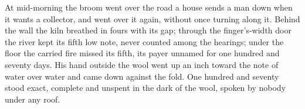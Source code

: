 At mid-morning the broom went over the road a house sends a man down when it wants a collector, and went over it again, without once turning along it. Behind the wall the kiln breathed in fours with its gap; through the finger's-width door the river kept its fifth low note, never counted among the hearings; under the floor the carried fire missed its fifth, its payer unnamed for one hundred and seventy days. His hand outside the wool went up an inch toward the note of water over water and came down against the fold. One hundred and seventy stood exact, complete and unspent in the dark of the wool, spoken by nobody under any roof.
